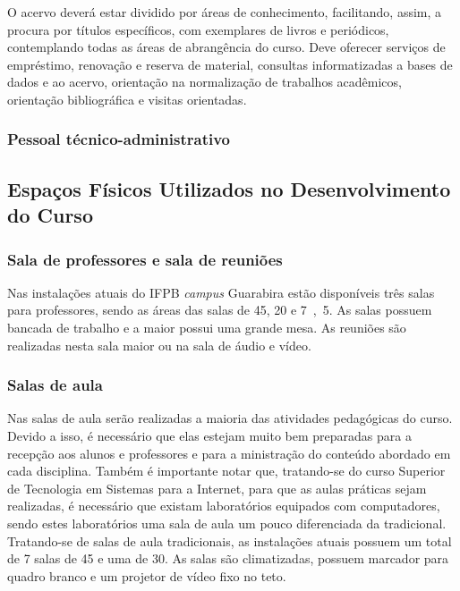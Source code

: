 O acervo deverá estar dividido por áreas de conhecimento, facilitando, assim, a procura por títulos específicos, com exemplares de livros e periódicos, contemplando todas as áreas de abrangência do curso. Deve oferecer serviços de empréstimo, renovação e reserva de material, consultas informatizadas a bases de dados e ao acervo, orientação na normalização de trabalhos acadêmicos, orientação bibliográfica e visitas orientadas.

\subsubsection{Pessoal técnico-administrativo}


\subsection{Espa\c{c}os F\'isicos Utilizados no Desenvolvimento do Curso}

\subsubsection{Sala de professores e sala de reuni\~oes}

Nas instalações atuais do IFPB \textit{campus} Guarabira estão disponíveis três salas para professores, sendo as áreas das salas de \unit{45}{\squaremetre}, \unit{20}{\squaremetre} e \unit{7,5}{\squaremetre}. As salas possuem bancada de trabalho e a maior possui uma grande mesa. As reuniões são realizadas nesta sala maior ou na sala de áudio e vídeo.


\subsubsection{Salas de aula}

Nas salas de aula serão realizadas a maioria das atividades pedagógicas do curso. Devido a isso, é necessário que elas estejam muito bem preparadas para a recepção aos alunos e professores e para a ministração do conteúdo abordado em cada disciplina. Também é importante notar que, tratando-se do curso Superior de Tecnologia em Sistemas para a Internet, para que as aulas práticas sejam realizadas, é necessário que existam laboratórios equipados com computadores,  sendo estes laboratórios uma sala de aula um pouco diferenciada da tradicional. Tratando-se de salas de aula tradicionais, as instalações atuais possuem um total de 7 salas de \unit{45}{\squaremetre} e uma de \unit{30}{\squaremetre}. As salas são climatizadas, possuem marcador para quadro branco e um projetor de vídeo fixo no teto.

